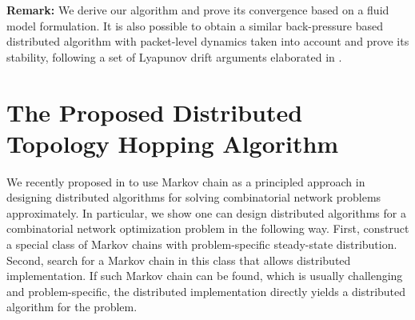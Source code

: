 \documentclass[10pt,conference]{IEEEtran}
\begin{document}
\textbf{Remark:} We derive our algorithm and prove its convergence based on a fluid model formulation.
It is also possible to obtain a similar back-pressure based distributed algorithm with
packet-level dynamics taken into account and prove its stability,  following
a set of Lyapunov drift arguments elaborated in \cite{georgiadis2006resource}.



\begin{comment}
\begin{itemize}
\item In our algorithm, problem \eqref{eq:solve-g} is solved through the
back-pressure scheduling in a way that the neighbor with the maximum
aggregate back-pressure is selected and the transmission rate is set
as the node's upload capacity. Network coding guarantees the transmission
rate can be achieved.
\item Compared to the classical back-pressure algorithm \cite{georgiadis2006resource},
our algorithm is derived through the method of Lagrangian decomposition.
By considering packet-level dynamics, we can obtain similar distributed
solutions. Also our back-pressure scheduling involves the neighbor
selection process uniquely. The uniqueness is determined by the feature
of P2P networks where node's upload capacity is the bottleneck.
\item For each node , it chops its time into slots. In each time
slot, node  selects one neighbor according to the neighbor scheduling
policy, and sends out one coded packet according to the content scheduling
policy at the rate of its upload capacity. Every node updates 
accordingly and the source updates the streaming rate . We remark
that the algorithm
\end{itemize}

\end{comment}

\section{The Proposed Distributed Topology Hopping Algorithm}

\label{sec:maf}

We recently proposed in \cite{MA:CLSC10} to use Markov chain as a principled approach in designing distributed algorithms for solving combinatorial network problems approximately. In particular, we show one can design distributed algorithms for a combinatorial network optimization problem in the following way. First, construct a special class of Markov chains with problem-specific steady-state distribution. Second, search for a Markov chain in this class that allows distributed implementation. If such Markov chain can be found, which is usually challenging and problem-specific, the distributed implementation directly yields a distributed algorithm for the problem.
\end{document}
